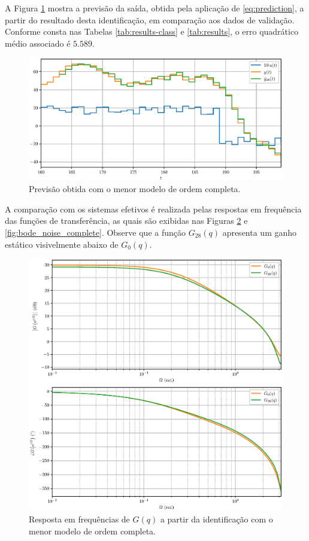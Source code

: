 \documentclass{ppgeesa}
\begin{document}
A Figura \ref{fig:prediction} mostra a previsão da saída, obtida pela aplicação de \eqref{eq:prediction}, a partir do resultado desta identificação, em comparação aos dados de validação.
Conforme consta nas Tabelas \ref{tab:results-class} e \ref{tab:results}, o erro quadrático médio associado é $\num{5.589}$.
\begin{figure}[!htbp]
  \centering
  \includegraphics[width=\linewidth]{y_p_28}
  \caption{Previsão obtida com o menor modelo de ordem completa.}
  \label{fig:prediction}
\end{figure}

A comparação com os sistemas efetivos é realizada pelas respostas em frequência das funções de transferência, as quais são exibidas nas Figuras \ref{fig:bode_system_complete} e \ref{fig:bode_noise_complete}.
Observe que a função $G_{28}(q)$ apresenta um ganho estático visivelmente abaixo de $G_0(q)$.
\begin{figure}[!htbp]
  \centering
  \includegraphics[width=\linewidth]{bode_G_28}
  \caption{Resposta em frequências de $G(q)$ a partir da identificação com o menor modelo de ordem completa.}
  \label{fig:bode_system_complete}
\end{figure}
\end{document}
